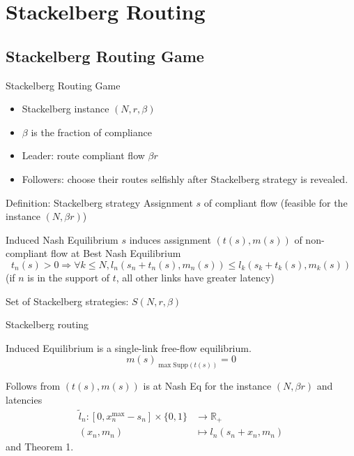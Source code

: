 \documentclass[xcolor=svgnames, english, smaller]{beamer}
\theoremstyle{plain}
\theoremstyle{definition}
\theoremstyle{plain}
\theoremstyle{plain}
\begin{document}
\section{Stackelberg Routing}

\subsection{Stackelberg Routing Game}
\begin{frame}{Stackelberg Routing Game}

\begin{itemize}
\item Stackelberg instance $(N, r, \beta)$
\item $\beta$ is the fraction of compliance
\item Leader: route compliant flow $\beta r$
\item Followers: choose their routes selfishly after Stackelberg strategy is revealed.
\end{itemize}


\begin{block}{Definition: Stackelberg strategy}
Assignment $s$ of compliant flow (feasible for the instance $(N,\beta r)$)
\end{block}

\begin{block}{Induced Nash Equilibrium}
$s$ induces assignment $(t(s), m(s))$ of non-compliant flow at Best Nash Equilibrium
\[
t_n(s)>0 \Rightarrow \forall k \leq N, l_n(s_n + t_n(s), m_n(s)) \leq l_k(s_k + t_k(s), m_k(s))
\]
(if $n$ is in the support of $t$, all other links have greater latency)
\end{block}

Set of Stackelberg strategies: $S(N, r, \beta)$

\end{frame}


\begin{frame}{Stackelberg routing}

\begin{lemma}
Induced Equilibrium is a single-link free-flow equilibrium.
\[
m(s)_{\max \text{Supp}(t(s))} = 0
\]
\end{lemma}

Follows from $(t(s), m(s))$ is at Nash Eq for the instance $(N,\beta r)$ and latencies
\begin{align*}
\tilde{l}_n: [0, x_n^{\max} - s_n]\times \{0,1\} & \rightarrow \mathbb{R}_+\\
(x_n,m_n) & \mapsto l_n(s_n+x_n,m_n)
\end{align*}
and Theorem 1.

\end{frame}
\end{document}
